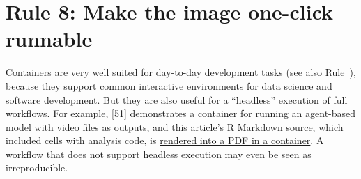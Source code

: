 \documentclass[10pt,letterpaper]{article}
\begin{document}
\hypertarget{rule-8-make-the-image-one-click-runnable}{%
\section*{Rule 8: Make the image one-click
runnable}\label{rule-8-make-the-image-one-click-runnable}}

  \label{rule:interactive} 

Containers are very well suited for day-to-day development tasks (see
also \hyperref[{rule:usage}]{Rule~}), because they
support common interactive environments for data science and software
development. But they are also useful for a ``headless'' execution of
full workflows. For example, {[}51{]} demonstrates a container for
running an agent-based model with video files as outputs, and this
article's \href{https://rmarkdown.rstudio.com/}{R Markdown} source,
which included cells with analysis code, is
\href{https://github.com/nuest/ten-simple-rules-dockerfiles/blob/master/.travis.yml\#L18}{rendered
into a PDF in a container}. A workflow that does not support headless
execution may even be seen as irreproducible.
\end{document}
